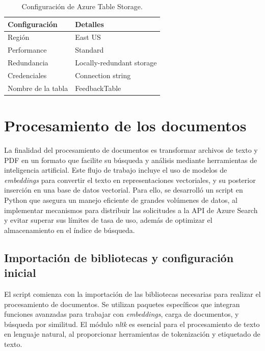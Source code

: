 \begin{table}[h]
	\centering
	\caption[Configuración de Azure Table Storage]{Configuración de Azure Table Storage.}
	\begin{tabular}{l l}    
		\toprule
		\textbf{Configuración} 	 & \textbf{Detalles} 	      \\
		\midrule
		Región                   &	East US 				  \\		
		Performance	             &  Standard				  \\
		Redundancia	             &  Locally-redundant storage \\
		Credenciales             &  Connection string         \\
		Nombre de la tabla       &	FeedbackTable             \\
		\bottomrule
		\hline
	\end{tabular}
	\label{tab:config-table-storage}
\end{table}

\section{Procesamiento de los documentos}

La finalidad del procesamiento de documentos es transformar archivos de texto y PDF en un formato que facilite su búsqueda y análisis mediante 
herramientas de inteligencia artificial. Este flujo de trabajo incluye el uso de modelos de \textit{embeddings} para convertir el texto en 
representaciones vectoriales, y su posterior inserción en una base de datos vectorial. Para ello, se desarrolló un script en Python que asegura 
un manejo eficiente de grandes volúmenes de datos, al implementar mecanismos para distribuir las solicitudes a la API de Azure Search y evitar 
superar sus límites de tasa de uso, además de optimizar el almacenamiento en el índice de búsqueda.

\subsection{Importación de bibliotecas y configuración inicial}

El script comienza con la importación de las bibliotecas necesarias para realizar el procesamiento de documentos. Se utilizan paquetes específicos 
que integran funciones avanzadas para trabajar con \textit{embeddings}, carga de documentos, y búsqueda por similitud. El módulo \textit{nltk} es esencial 
para el procesamiento de texto en lenguaje natural, al proporcionar herramientas de tokenización y etiquetado de texto.

